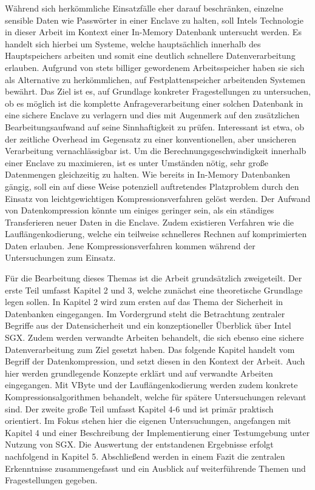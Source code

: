 Während sich herkömmliche Einsatzfälle eher darauf beschränken, einzelne sensible Daten wie Passwörter in einer Enclave zu halten, soll Intels Technologie in dieser Arbeit im Kontext einer In-Memory Datenbank untersucht werden. Es handelt sich hierbei um Systeme, welche hauptsächlich innerhalb des Hauptspeichers arbeiten und somit eine deutlich schnellere Datenverarbeitung erlauben. Aufgrund von stets billiger gewordenem Arbeitsspeicher haben sie sich als  Alternative zu herkömmlichen, auf Festplattenspeicher arbeitenden Systemen bewährt. Das Ziel ist es, auf Grundlage konkreter Fragestellungen zu untersuchen, ob es möglich ist die komplette Anfrageverarbeitung einer solchen Datenbank in eine sichere Enclave zu verlagern und dies mit Augenmerk auf den zusätzlichen Bearbeitungsaufwand auf seine Sinnhaftigkeit zu prüfen. Interessant ist etwa, ob der zeitliche Overhead im Gegensatz zu einer konventionellen, aber unsicheren Verarbeitung vernachlässigbar ist. Um die Berechnungsgeschwindigkeit innerhalb einer Enclave zu maximieren, ist es unter Umständen nötig, sehr große Datenmengen gleichzeitig zu halten. Wie bereits in In-Memory Datenbanken gängig, soll ein auf diese Weise potenziell auftretendes Platzproblem durch den Einsatz von leichtgewichtigen Kompressionsverfahren gelöst werden. Der Aufwand von Datenkompression könnte um einiges geringer sein, als ein ständiges Transferieren neuer Daten in die Enclave. Zudem existieren Verfahren wie die Lauflängenkodierung, welche ein teilweise schnelleres Rechnen auf komprimierten Daten erlauben. Jene Kompressionsverfahren kommen während der Untersuchungen zum Einsatz.

Für die Bearbeitung dieses Themas ist die Arbeit grundsätzlich zweigeteilt. Der erste Teil umfasst Kapitel 2 und 3, welche zunächst eine theoretische Grundlage legen sollen. In Kapitel 2 wird zum ersten auf das Thema der Sicherheit in Datenbanken eingegangen. Im Vordergrund steht die Betrachtung zentraler Begriffe aus der Datensicherheit und ein konzeptioneller Überblick über Intel SGX. Zudem werden verwandte Arbeiten behandelt, die sich ebenso eine sichere Datenverarbeitung zum Ziel gesetzt haben. Das folgende Kapitel handelt vom Begriff der Datenkompression, und setzt diesen in den Kontext der Arbeit. Auch hier werden grundlegende Konzepte erklärt und auf verwandte Arbeiten eingegangen. Mit VByte und der Lauflängenkodierung werden zudem konkrete Kompressionsalgorithmen behandelt, welche für spätere Untersuchungen relevant sind. Der zweite große Teil umfasst Kapitel 4-6 und ist primär praktisch orientiert. Im Fokus stehen hier die eigenen Untersuchungen, angefangen mit Kapitel 4 und einer Beschreibung der Implementierung einer Testumgebung unter Nutzung von SGX. Die Auswertung der entstandenen Ergebnisse erfolgt nachfolgend in Kapitel 5. Abschließend werden in einem Fazit die zentralen Erkenntnisse zusammengefasst und ein Ausblick auf weiterführende Themen und Fragestellungen gegeben.